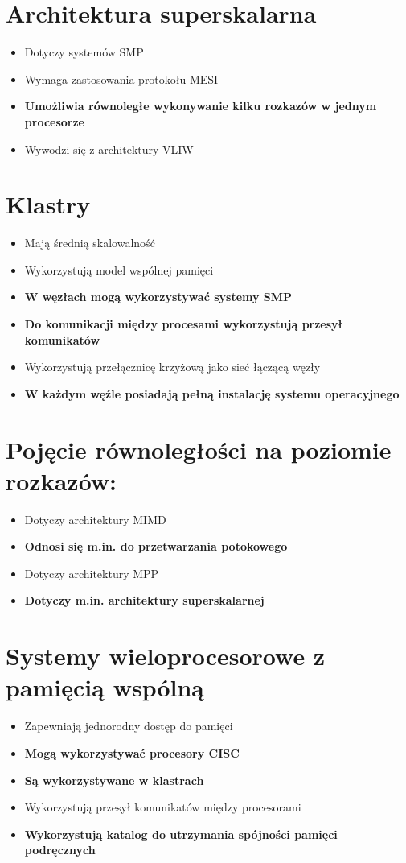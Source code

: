 \documentclass[a4paper,twoside]{article}
\begin{document}
\section{Architektura superskalarna}
	\begin{itemize}
    \item Dotyczy systemów SMP
    \item Wymaga zastosowania protokołu MESI
    \item \textbf{Umożliwia równoległe wykonywanie kilku rozkazów w jednym procesorze}
    \item Wywodzi się z architektury VLIW
    \end{itemize}

\section{Klastry}
	\begin{itemize}
    \item Mają średnią skalowalność
    \item Wykorzystują model wspólnej pamięci
    \item \textbf{W węzłach mogą wykorzystywać systemy SMP}
    \item \textbf{Do komunikacji między procesami wykorzystują przesył komunikatów}
    \item Wykorzystują przełącznicę krzyżową jako sieć łączącą węzły
    \item \textbf{W każdym węźle posiadają pełną instalację systemu operacyjnego}
    \end{itemize}

\section{Pojęcie równoległości na poziomie rozkazów:}
	\begin{itemize}
    \item Dotyczy architektury MIMD
    \item \textbf{Odnosi się m.in. do przetwarzania potokowego}
    \item Dotyczy architektury MPP
    \item \textbf{Dotyczy m.in. architektury superskalarnej}
    \end{itemize}

\section{Systemy wieloprocesorowe z pamięcią wspólną}
	\begin{itemize}
    \item Zapewniają jednorodny dostęp do pamięci
    \item \textbf{Mogą wykorzystywać procesory CISC}
    \item \textbf{Są wykorzystywane w klastrach}
    \item Wykorzystują przesył komunikatów między procesorami
    \item \textbf{Wykorzystują katalog do utrzymania spójności pamięci podręcznych}
    \end{itemize}
\end{document}
